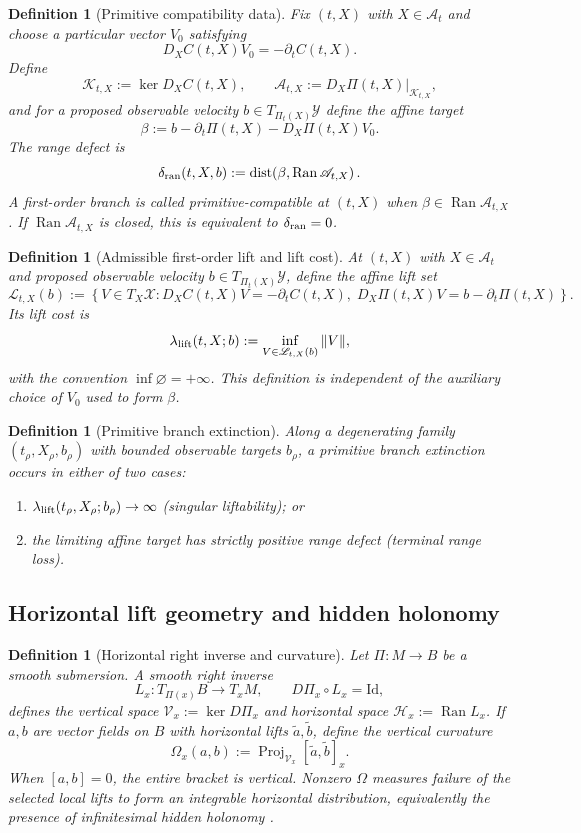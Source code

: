 \documentclass[12pt]{article}
\newtheorem{definition}[theorem]{Definition}
\newcommand{\A}{\mathcal A}
\newcommand{\X}{\mathcal X}
\newcommand{\Y}{\mathcal Y}
\newcommand{\Ran}{\operatorname{Ran}}
\newcommand{\Proj}{\operatorname{Proj}}
\newcommand{\dist}{\operatorname{dist}}
\newcommand{\Id}{\mathrm{Id}}
\newcommand{\Hh}{\mathcal H}
\newcommand{\Kt}{\mathcal K}
\newcommand{\Vv}{\mathcal V}
\newcommand{\Comp}{\mathscr A}
\begin{document}
\begin{definition}[Primitive compatibility data]\label{def:compatibility}
Fix $(t,X)$ with $X\in\A_t$ and choose a particular vector $V_0$ satisfying
\[
D_XC(t,X)V_0=-\partial_tC(t,X).
\]
Define
\[
\Kt_{t,X}:=\ker D_XC(t,X),
\qquad
\Comp_{t,X}:=D_X\Pi(t,X)|_{\Kt_{t,X}},
\]
and for a proposed observable velocity $b\in T_{\Pi_t(X)}\Y$ define the affine target
\[
\beta:=b-\partial_t\Pi(t,X)-D_X\Pi(t,X)V_0.
\]
The \emph{range defect} is
\[
\delta_{\rm ran}(t,X,b):=\dist\!\left(\beta,\Ran\Comp_{t,X}\right).
\]
A first-order branch is called \emph{primitive-compatible} at $(t,X)$ when $\beta\in\Ran\Comp_{t,X}$. If $\Ran\Comp_{t,X}$ is closed, this is equivalent to $\delta_{\rm ran}=0$.
\end{definition}

\begin{definition}[Admissible first-order lift and lift cost]\label{def:first-order-lift}
At $(t,X)$ with $X\in\A_t$ and proposed observable velocity $b\in T_{\Pi_t(X)}\Y$, define the affine lift set
\[
\mathscr L_{t,X}(b)
:=\left\{V\in T_X\X:
D_XC(t,X)V=-\partial_tC(t,X),\;
D_X\Pi(t,X)V=b-\partial_t\Pi(t,X)
\right\}.
\]
Its \emph{lift cost} is
\[
\lambda_{\rm lift}(t,X;b)
:=\inf_{V\in\mathscr L_{t,X}(b)}\|V\|,
\]
with the convention $\inf\varnothing=+\infty$. This definition is independent of the auxiliary choice of $V_0$ used to form $\beta$.
\end{definition}

\begin{definition}[Primitive branch extinction]\label{def:branch-extinction}
Along a degenerating family $(t_\rho,X_\rho,b_\rho)$ with bounded observable targets $b_\rho$, a \emph{primitive branch extinction} occurs in either of two cases:
\begin{enumerate}[label=(\roman*),leftmargin=2.2em,itemsep=0pt,topsep=0.2em]
\item $\lambda_{\rm lift}(t_\rho,X_\rho;b_\rho)\to\infty$ (singular liftability); or
\item the limiting affine target has strictly positive range defect (terminal range loss).
\end{enumerate}
\end{definition}

\subsection{Horizontal lift geometry and hidden holonomy}
\begin{definition}[Horizontal right inverse and curvature]\label{def:connection}
Let $\Pi:M\to B$ be a smooth submersion. A smooth right inverse
\[
L_x:T_{\Pi(x)}B\to T_xM,
\qquad D\Pi_x\circ L_x=\Id,
\]
defines the vertical space $\Vv_x:=\ker D\Pi_x$ and horizontal space $\Hh_x:=\Ran L_x$. If $a,b$ are vector fields on $B$ with horizontal lifts $\widetilde a,
\widetilde b$, define the vertical curvature
\[
\Omega_x(a,b):=\Proj_{\Vv_x}[\widetilde a,\widetilde b]_x.
\]
When $[a,b]=0$, the entire bracket is vertical. Nonzero $\Omega$ measures failure of the selected local lifts to form an integrable horizontal distribution, equivalently the presence of infinitesimal hidden holonomy \cite{KobayashiNomizu}.
\end{definition}
\end{document}
